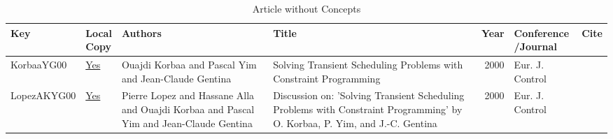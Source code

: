 {\scriptsize
\begin{longtable}{llp{5cm}p{10cm}rp{3cm}l}
\caption{Article without Concepts}\\ \toprule
Key & \shortstack{Local\\Copy} & Authors & Title & Year & \shortstack{Conference\\/Journal} & Cite\\ \midrule
\endhead
\bottomrule
\endfoot
KorbaaYG00 & \href{articles/KorbaaYG00.pdf}{Yes} & Ouajdi Korbaa and Pascal Yim and Jean{-}Claude Gentina & Solving Transient Scheduling Problems with Constraint Programming & 2000 & Eur. J. Control & \cite{KorbaaYG00}\\LopezAKYG00 & \href{articles/LopezAKYG00.pdf}{Yes} & Pierre Lopez and Hassane Alla and Ouajdi Korbaa and Pascal Yim and Jean{-}Claude Gentina & Discussion on: 'Solving Transient Scheduling Problems with Constraint Programming' by O. Korbaa, P. Yim, and {J.-C.} Gentina & 2000 & Eur. J. Control & \cite{LopezAKYG00}\\\end{longtable}
}


